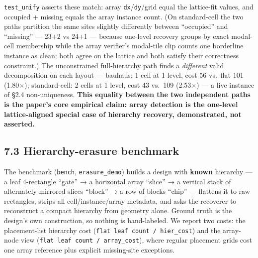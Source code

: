 \documentclass[
  11pt,
]{article}
\begin{document}
\texttt{test\_unify} asserts these match: array
\texttt{dx}/\texttt{dy}/grid equal the lattice-fit values, and occupied
+ missing equals the array instance count. (On standard-cell the two
paths partition the same sites slightly differently between ``occupied''
and ``missing'' --- 23+2 vs 24+1 --- because one-level recovery groups
by exact modal-cell membership while the array verifier's modal-tile
clip counts one borderline instance as clean; both agree on the lattice
and both satisfy their correctness constraint.) The unconstrained
full-hierarchy path finds a \emph{different} valid decomposition on each
layout --- bauhaus: 1 cell at 1 level, cost 56 vs.~flat 101 (1.80×);
standard-cell: 2 cells at 1 level, cost 43 vs.~109 (2.53×) --- a live
instance of §2.4 non-uniqueness. \textbf{This equality between the two
independent paths is the paper's core empirical claim: array detection
is the one-level lattice-aligned special case of hierarchy recovery,
demonstrated, not asserted.}

\subsection{7.3 Hierarchy-erasure
benchmark}\label{hierarchy-erasure-benchmark}

The benchmark (\texttt{bench}, \texttt{erasure\_demo}) builds a design
with \textbf{known} hierarchy --- a leaf 4-rectangle ``gate'' → a
horizontal array ``slice'' → a vertical stack of alternately-mirrored
slices ``block'' → a row of blocks ``chip'' --- flattens it to raw
rectangles, strips all cell/instance/array metadata, and asks the
recoverer to reconstruct a compact hierarchy from geometry alone. Ground
truth is the design's own construction, so nothing is hand-labeled. We
report two costs: the placement-list hierarchy cost
(\texttt{flat\ leaf\ count\ /\ hier\_cost}) and the array-node view
(\texttt{flat\ leaf\ count\ /\ array\_cost}), where regular placement
grids cost one array reference plus explicit missing-site exceptions.
\end{document}
